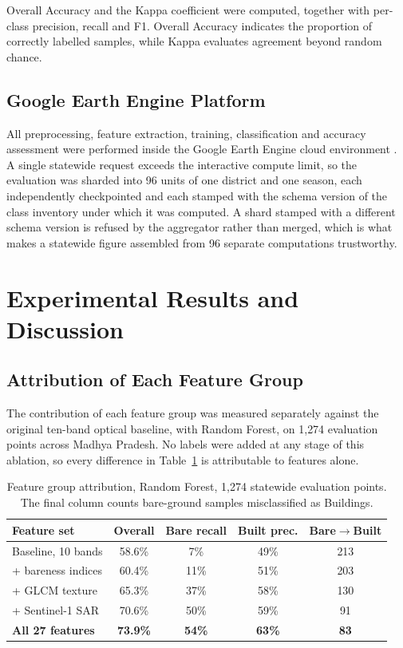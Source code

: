 \documentclass[conference]{IEEEtran}
\begin{document}
Overall Accuracy and the Kappa coefficient \cite{ref30} were computed,
together with per-class precision, recall and F1. Overall Accuracy
indicates the proportion of correctly labelled samples, while Kappa
evaluates agreement beyond random chance.

\subsection{Google Earth Engine Platform}

All preprocessing, feature extraction, training, classification and
accuracy assessment were performed inside the Google Earth Engine cloud
environment \cite{ref11}. A single statewide request exceeds the
interactive compute limit, so the evaluation was sharded into 96 units
of one district and one season, each independently checkpointed and each
stamped with the schema version of the class inventory under which it was
computed. A shard stamped with a different schema version is refused by
the aggregator rather than merged, which is what makes a statewide
figure assembled from 96 separate computations trustworthy.

\section{Experimental Results and Discussion}

\subsection{Attribution of Each Feature Group}

The contribution of each feature group was measured separately against
the original ten-band optical baseline, with Random Forest, on 1{,}274
evaluation points across Madhya Pradesh. No labels were added at any
stage of this ablation, so every difference in Table~\ref{tab:ablation}
is attributable to features alone.

\begin{table}[!t]
\caption{Feature group attribution, Random Forest, 1{,}274 statewide
evaluation points. The final column counts bare-ground samples
misclassified as Buildings.}
\label{tab:ablation}
\centering
\footnotesize
\begin{tabular}{@{}lcccc@{}}
\toprule
\textbf{Feature set} & \textbf{Overall} & \textbf{Bare recall} &
\textbf{Built prec.} & \textbf{Bare$\rightarrow$Built} \\
\midrule
Baseline, 10 bands      & 58.6\% & 7\%  & 49\% & 213 \\
+ bareness indices      & 60.4\% & 11\% & 51\% & 203 \\
+ GLCM texture          & 65.3\% & 37\% & 58\% & 130 \\
+ Sentinel-1 SAR        & 70.6\% & 50\% & 59\% & 91  \\
\textbf{All 27 features} & \textbf{73.9\%} & \textbf{54\%} & \textbf{63\%} & \textbf{83} \\
\bottomrule
\end{tabular}
\end{table}
\end{document}

